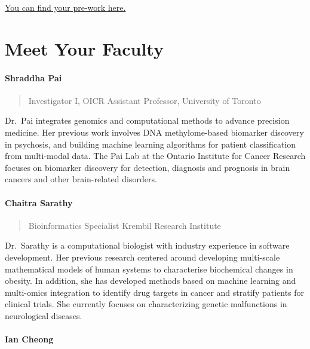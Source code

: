 \documentclass[
]{book}
\begin{document}
\href{https://docs.google.com/forms/d/e/1FAIpQLSejq4D7rOuJGTgqQLQJheCk9hirJGQsoJabKJN8SHfJX7GSRw/viewform}{You can find your pre-work here.}

\chapter{Meet Your Faculty}\label{meet-your-faculty}

\subsubsection{Shraddha Pai}\label{shraddha-pai}

\begin{quote}
Investigator I, OICR
Assistant Professor, University of Toronto
\end{quote}

Dr.~Pai integrates genomics and computational methods to advance precision medicine. Her previous work involves DNA methylome-based biomarker discovery in psychosis, and building machine learning algorithms for patient classification from multi-modal data. The Pai Lab at the Ontario Institute for Cancer Research focuses on biomarker discovery for detection, diagnosis and prognosis in brain cancers and other brain-related disorders.

\subsubsection{Chaitra Sarathy}\label{chaitra-sarathy}

\begin{quote}
Bioinformatics Specialist
Krembil Research Institute
\end{quote}

Dr.~Sarathy is a computational biologist with industry experience in software development. Her previous research centered around developing multi-scale mathematical models of human systems to characterise biochemical changes in obesity. In addition, she has developed methods based on machine learning and multi-omics integration to identify drug targets in cancer and stratify patients for clinical trials. She currently focuses on characterizing genetic malfunctions in neurological diseases.

\subsubsection{Ian Cheong}\label{ian-cheong}
\end{document}
